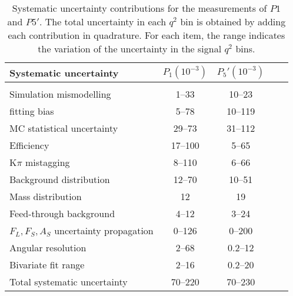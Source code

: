 \begin{table*}[htbp!]
  \centering
  \caption{\label{tab:systematics} Systematic uncertainty contributions for the measurements of $P1$ and $P5'$.
    The total uncertainty in each $q^2$ bin is obtained by adding each contribution in quadrature.
    For each item, the range indicates the variation of the uncertainty in the signal $q^2$ bins.}
  \begin{tabular}{l|cccc}
    Systematic uncertainty & $P_1 (10^{-3})$ & $P_5' (10^{-3})$ \\[1pt]
    \hline \\[-2ex]
    Simulation mismodelling               &  1--33  &  10--23  \\[1pt]
    fitting bias                          &  5--78  &  10--119 \\[1pt]
    MC statistical uncertainty            & 29--73  &  31--112 \\[1pt]
    Efficiency                            & 17--100 &   5--65  \\[1pt]
    $\textrm{K}\pi$ mistagging                   &  8--110 &   6--66  \\[1pt]
    Background distribution               & 12--70  &  10--51  \\[1pt]
    Mass distribution                     &     12  &      19  \\[1pt]
    Feed-through background               &  4--12  &   3--24  \\[1pt]
    $F_L,F_S,A_S$ uncertainty propagation &  0--126 &   0--200 \\[1pt]
    Angular resolution                    &  2--68  & 0.2--12  \\[1pt]
    Bivariate fit range                   &  2--16  & 0.2--20  \\[1pt]
    \hline
    Total systematic uncertainty          & 70--220 &  70--230 \\[1pt]
  \end{tabular}
\end{table*}
